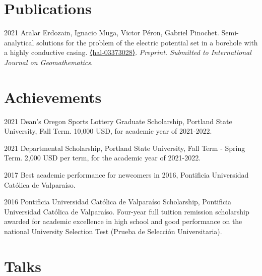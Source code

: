 \documentclass[12pt,letterpaper]{report}
\begin{document}
    \section*{Publications}

    \begin{tablist}

    \item[2021] \tab Aralar Erdozain, Ignacio Muga, Victor Péron, Gabriel Pinochet. Semi-analytical solutions for the problem of the electric potential set in a borehole with a highly conductive casing. \href{https://hal.archives-ouvertes.fr/hal-03373028}{⟨hal-03373028⟩}. \emph{Preprint. Submitted to International Journal on Geomathematics.}

    \end{tablist}

    \section*{Achievements}

    \begin{tablist}

        \item[2021] \tab Dean's Oregon Sports Lottery Graduate Scholarship, Portland State University, Fall Term. 10,000 USD, for academic year of 2021-2022.

        \item[2021] \tab Departmental Scholarship, Portland State University, Fall Term - Spring Term. 2,000 USD per term, for the academic year of 2021-2022.

        \item[2017] \tab Best academic performance for newcomers in 2016, Pontificia Universidad Cat\'olica de Valpara\'iso.

        \item[2016] \tab Pontificia Universidad Cat\'olica de Valpara\'iso Scholarship, Pontificia Universidad Cat\'olica de Valpara\'iso. Four-year full tuition remission scholarship awarded for academic excellence in high school and good performance on the national University Selection Test (Prueba de Selecci\'on Universitaria).

    \end{tablist}

    \section*{Talks}
\end{document}
